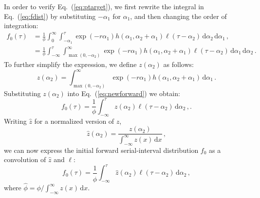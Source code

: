 \documentclass[12pt]{article}
\newcommand{\eref}[1]{Eq.~(\ref{eq:#1})}
\newcommand{\dd}[1]{\ensuremath{\, \mathrm{d}#1}}
\newcommand{\dx}{\dd{x}}
\newcommand{\pinf}{\ensuremath{\alpha_1}} %
\newcommand{\sinf}{\ensuremath{\alpha_2}} %
\newcommand{\idist}{\ell} %
\begin{document}
In order to verify \eref{ptarget}, we first rewrite the integral in \eref{fdist} by substituting $-\alpha_1$ for $\alpha_1$, and then changing the order of integration:
\begin{align}
f_{0}(\tau) &= \frac{1}{\phi} \int_0^\infty \int_{-\pinf}^{\tau} \exp(-r\pinf) h(\pinf, \sinf + \pinf) \idist(\tau - \sinf)\, \mathrm{d}\sinf\,\mathrm{d}\pinf\,,\nonumber \\
&= \frac{1}{\phi} \int_{-\infty}^{\tau} \int_{\max{(0,-\sinf)}}^{\infty} \exp(-r\pinf) h(\pinf, \sinf + \pinf)\idist(\tau - \sinf)\,\mathrm{d}\pinf\, \mathrm{d}\sinf\,.
\label{eq:newforward}
\end{align}
To further simplify the expression, we define $z(\sinf)$ as follows:
\begin{equation}
z(\sinf) = \int_{\max{(0,-\sinf)}}^{\infty} \exp(-r\pinf) h(\pinf, \sinf + \pinf) \,\mathrm{d}\pinf\,.
\end{equation}
Substituting $z(\sinf)$ into \eref{newforward} we obtain:
\begin{equation}
f_{0}(\tau) = \frac{1}{\phi} \int_{-\infty}^{\tau} z(\sinf) \idist(\tau - \sinf) \,\mathrm{d}\sinf\,,.
\end{equation}
Writing $\hat{z}$ for a normalized version of $z$,
\begin{equation}\hat{z}(\sinf) = \frac{z(\sinf)}{\int_{-\infty}^\infty z(x) \dx}\,,\end{equation}
we can now express the initial forward serial-interval distribution
$f_0$ as a convolution of $\hat{z}$ and $\idist$:
\begin{equation}
f_{0}(\tau) = \frac{1}{\hat{\phi}} \int_{-\infty}^{\tau} \hat{z}(\sinf) \idist(\tau - \sinf)\, \mathrm{d}\sinf\,,
\end{equation}
where $\hat{\phi} = \phi/\int_{-\infty}^\infty z(x) \dx$.
\end{document}
